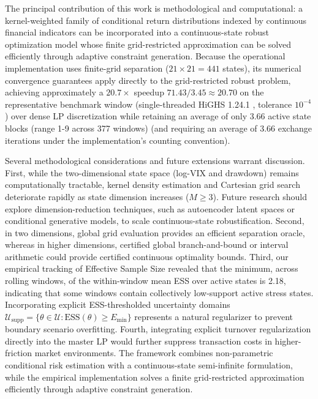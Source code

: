 \documentclass[smallextended]{svjour3}
\begin{document}
The principal contribution of this work is methodological and computational: a kernel-weighted family of conditional return distributions indexed by continuous financial indicators can be incorporated into a continuous-state robust optimization model whose finite grid-restricted approximation can be solved efficiently through adaptive constraint generation. Because the operational implementation uses finite-grid separation ($21\times21 = 441$ states), its numerical convergence guarantees apply directly to the grid-restricted robust problem, achieving approximately a $20.7\times$ speedup $71.43/3.45\approx20.70$ on the representative benchmark window (single-threaded HiGHS 1.24.1 \cite{huangfu2018parallelizing}, tolerance $10^{-4}$) over dense LP discretization while retaining an average of only 3.66 active state blocks (range 1-9 across 377 windows) (and requiring an average of 3.66 exchange iterations under the implementation's counting convention).

Several methodological considerations and future extensions warrant discussion. First, while the two-dimensional state space (log-VIX and drawdown) remains computationally tractable, kernel density estimation and Cartesian grid search deteriorate rapidly as state dimension increases ($M \ge 3$). Future research should explore dimension-reduction techniques, such as autoencoder latent spaces or conditional generative models, to scale continuous-state robustification. Second, in two dimensions, global grid evaluation provides an efficient separation oracle, whereas in higher dimensions, certified global branch-and-bound or interval arithmetic could provide certified continuous optimality bounds. Third, our empirical tracking of Effective Sample Size revealed that the minimum, across rolling windows, of the within-window mean ESS over active states is 2.18, indicating that some windows contain collectively low-support active stress states. Incorporating explicit ESS-thresholded uncertainty domains $\mathcal{U}_{\text{supp}} = \{\theta \in \mathcal{U} : \text{ESS}(\theta) \ge E_{\min}\}$ represents a natural regularizer to prevent boundary scenario overfitting. Fourth, integrating explicit turnover regularization directly into the master LP would further suppress transaction costs in higher-friction market environments. The framework combines non-parametric conditional risk estimation with a continuous-state semi-infinite formulation, while the empirical implementation solves a finite grid-restricted approximation efficiently through adaptive constraint generation.
\end{document}
